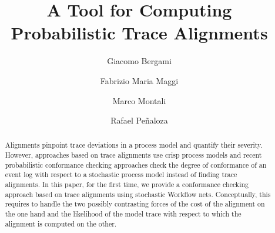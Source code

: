 \documentclass[runningheads]{llncs}
\begin{document}
%
\title{A Tool for Computing\\Probabilistic Trace Alignments}
%
%
\author{Giacomo Bergami \and
Fabrizio Maria Maggi \and
Marco Montali \and
Rafael Pe\~naloza}
%
%
%
\maketitle              %
%
\begin{abstract}
Alignments pinpoint trace deviations in a process model and quantify their severity. However, approaches based on trace alignments use crisp process models and recent probabilistic conformance checking approaches check the degree of conformance of an event log with respect to a stochastic process model instead of finding trace alignments. In this paper, for the first time, we provide a conformance checking approach based on trace alignments using stochastic Workflow nets. Conceptually, this requires to handle the two possibly contrasting forces of the cost of the alignment on the one hand and the likelihood of the model trace with respect to which the alignment is computed on the other.

\end{abstract}









\end{document}
